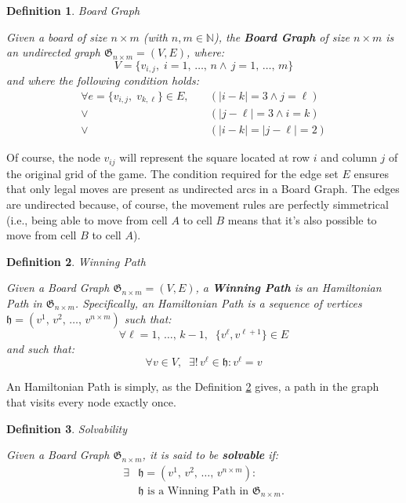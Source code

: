 \documentclass[conference]{IEEEtran}
\newtheorem{definition}{Definition}[section]
\begin{document}
\begin{definition}{Board Graph}{}
\label{def:board_graph}

Given a board of size $n \times m$ (with $n, m \in \mathbb{N}$), the \textbf{Board Graph} of size $n \times m$ is an undirected graph $\mathfrak{G}_{n \times m} = (V, E)$, where:
$$
    V = \{v_{i,j},\;i = 1,\,\dots,\,n \land \, j = 1,\,\dots,\,m\}
$$
and where the following condition holds:
\begin{align*}
\forall e = \{v_{i,j},\;v_{k,\ell}\} \in E,\quad&(|i - k| = 3 \land j = \ell) \\
\lor\,& (|j - \ell| = 3 \land i = k) \\
\lor\,& (|i - k| = |j - \ell| = 2)
\end{align*}

\end{definition}

Of course, the node $v_{ij}$ will represent the square located at row $i$ and column $j$ of the original grid of the game. 
The condition required for the edge set $E$ ensures that only legal moves are present as undirected arcs in a Board Graph. The edges are undirected because, of course, the movement rules are perfectly simmetrical (i.e., being able to move from cell $A$ to cell $B$ means that it's also possible to move from cell $B$ to cell $A$).

\begin{definition}{Winning Path}{} \label{def:winning_path}
	
Given a Board Graph $\mathfrak{G}_{n \times m} = (V, E)$, a \textbf{Winning Path} is an Hamiltonian Path in $\mathfrak{G}_{n \times m}$.
Specifically, an Hamiltonian Path is a sequence of vertices $\mathfrak{h} = (v^1,\,v^2,\,\dots,\,v^{n \times m})$ such that:
$$
    \forall \ell = 1,\,\dots,\,k-1,\;\; \{v^\ell, v^{\ell+1}\} \in E
$$
and such that:
$$
    \forall v \in V,\;\; \exists!\, v^\ell \in \mathfrak{h} : v^\ell = v
$$
\end{definition}

An Hamiltonian Path is simply, as the Definition \ref{def:winning_path} gives, a path in the graph that visits every node exactly once.

\begin{definition}{Solvability}{}
\label{def:solvability}

Given a Board Graph $\mathfrak{G}_{n \times m}$, it is said to be \textbf{solvable} if:
\begin{align*}
    \exists &\mathfrak{h} = (v^1,\,v^2,\,\dots,\,v^{n \times m}) : \\
            &\mathfrak{h} \text{ is a Winning Path in } \mathfrak{G}_{n \times m}.
\end{align*}
\end{definition}
\end{document}
